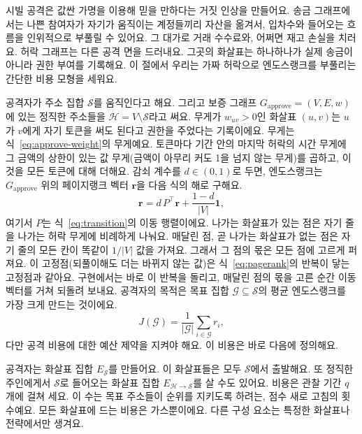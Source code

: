 
시빌 공격은 값싼 가명을 이용해 믿을 만하다는 거짓 인상을 만들어요. 송금 그래프에서는 나쁜 참여자가 자기가 움직이는 계정들끼리 자산을 옮겨서, 입차수와 들어오는 흐름을 인위적으로 부풀릴 수 있어요. 그 대가로 거래 수수료와, 어쩌면 재고 손실을 치러요. 허락 그래프는 다른 공격 면을 드러내요. 그곳의 화살표는 하나하나가 실제 송금이 아니라 권한 부여를 기록해요. 이 절에서 우리는 가짜 허락으로 엔도스랭크를 부풀리는 간단한 비용 모형을 세워요.


공격자가 주소 집합 $\mathcal{S}$를 움직인다고 해요. 그리고 보증 그래프 $G_{\text{approve}}=(V,E,w)$에 있는 정직한 주소들을 $\mathcal{H}=V\setminus\mathcal{S}$라고 써요. 무게가 $w_{uv}>0$인 화살표 $(u,v)$는 $u$가 $v$에게 자기 토큰을 써도 된다고 권한을 주었다는 기록이에요. 무게는 식~\eqref{eq:approve-weight}의 무게예요. 토큰마다 기간 안의 마지막 허락의 시간 무게에 그 금액의 상한이 있는 값 무게(금액이 아무리 커도 1을 넘지 않는 무게)를 곱하고, 이것을 모든 토큰에 대해 더해요. 감쇠 계수를 $d\in(0,1)$로 두면, 엔도스랭크는 $G_{\text{approve}}$ 위의 페이지랭크 벡터 $\mathbf{r}$을 다음 식의 해로 구해요.
\begin{equation}
\label{eq:pagerank-sybil}
\mathbf{r} = d\, P^{\top} \mathbf{r} + \frac{1-d}{|V|}\mathbf{1},
\end{equation}
여기서 $P$는 식~\eqref{eq:transition}의 이동 행렬이에요. 나가는 화살표가 있는 점은 자기 줄을 나가는 허락 무게에 비례하게 나눠요. 매달린 점, 곧 나가는 화살표가 없는 점은 자기 줄의 모든 칸이 똑같이 $1/|V|$ 값을 가져요. 그래서 그 점의 몫은 모든 점에 고르게 퍼져요. 이 고정점(되풀이해도 더는 바뀌지 않는 값)은 식~\eqref{eq:pagerank}의 반복이 닿는 고정점과 같아요. 구현에서는 바로 이 반복을 돌리고, 매달린 점의 몫을 고른 순간 이동 벡터를 거쳐 되돌려 보내요. 공격자의 목적은 목표 집합 $\mathcal{G}\subseteq\mathcal{S}$의 평균 엔도스랭크를 가장 크게 만드는 것이에요.
\begin{equation}
\label{eq:objective}
J(\mathcal{G}) = \frac{1}{|\mathcal{G}|}\sum_{i\in\mathcal{G}} r_i,
\end{equation}
다만 공격 비용에 대한 예산 제약을 지켜야 해요. 이 비용은 바로 다음에 정의해요.


공격자는 화살표 집합 $E_{\mathcal{S}}$를 만들어요. 이 화살표들은 모두 $\mathcal{S}$에서 출발해요. 또 정직한 주인에게서 $\mathcal{S}$로 들어오는 화살표 집합 $E_{\mathcal{H}\to\mathcal{S}}$를 살 수도 있어요. 비용은 관찰 기간 $q$개에 걸쳐 세요. 이 수는 목표 주소들이 순위를 지키도록 하려는, 점수 새로 고침의 횟수예요. 모든 화살표에 드는 비용은 가스뿐이에요. 다른 구성 요소는 특정한 화살표나 전략에서만 생겨요.

